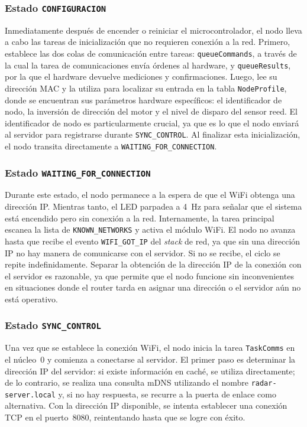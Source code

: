 \subsubsection*{Estado \texttt{CONFIGURACION}}

Inmediatamente después de encender o reiniciar el microcontrolador, el nodo lleva a cabo las tareas de inicialización que no requieren conexión a la red. Primero, establece las dos colas de comunicación entre tareas: \texttt{queueCommands}, a través de la cual la tarea de comunicaciones envía órdenes al hardware, y \texttt{queueResults}, por la que el hardware devuelve mediciones y confirmaciones. Luego, lee su dirección MAC y la utiliza para localizar su entrada en la tabla \texttt{NodeProfile}, donde se encuentran sus parámetros hardware específicos: el identificador de nodo, la inversión de dirección del motor y el nivel de disparo del sensor reed. El identificador de nodo es particularmente crucial, ya que es lo que el nodo enviará al servidor para registrarse durante \texttt{SYNC\_CONTROL}. Al finalizar esta inicialización, el nodo transita directamente a \texttt{WAITING\_FOR\_CONNECTION}.

\subsubsection*{Estado \texttt{WAITING\_FOR\_CONNECTION}}

Durante este estado, el nodo permanece a la espera de que el WiFi obtenga una dirección IP. Mientras tanto, el LED parpadea a 4~Hz para señalar que el sistema está encendido pero sin conexión a la red. Internamente, la tarea principal escanea la lista de \texttt{KNOWN\_NETWORKS} y activa el módulo WiFi. El nodo no avanza hasta que recibe el evento \texttt{WIFI\_GOT\_IP} del \textit{stack} de red, ya que sin una dirección IP no hay manera de comunicarse con el servidor. Si no se recibe, el ciclo se repite indefinidamente. Separar la obtención de la dirección IP de la conexión con el servidor es razonable, ya que permite que el nodo funcione sin inconvenientes en situaciones donde el router tarda en asignar una dirección o el servidor aún no está operativo.

\subsubsection*{Estado \texttt{SYNC\_CONTROL}}

Una vez que se establece la conexión WiFi, el nodo inicia la tarea \texttt{TaskComms} en el núcleo~0 y comienza a conectarse al servidor. El primer paso es determinar la dirección IP del servidor: si existe información en caché, se utiliza directamente; de lo contrario, se realiza una consulta mDNS utilizando el nombre \texttt{radar-server.local} y, si no hay respuesta, se recurre a la puerta de enlace como alternativa. Con la dirección IP disponible, se intenta establecer una conexión TCP en el puerto~8080, reintentando hasta que se logre con éxito.

